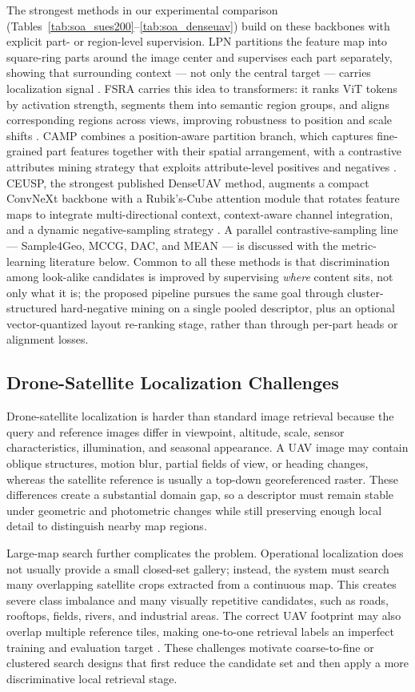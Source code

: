 \documentclass[conference]{IEEEtran}
\begin{document}
The strongest methods in our experimental comparison
(Tables~\ref{tab:soa_sues200}--\ref{tab:soa_denseuav}) build on these
backbones with explicit part- or region-level supervision. LPN partitions
the feature map into square-ring parts around the image center and
supervises each part separately, showing that surrounding context — not
only the central target — carries localization signal \cite{wang2021lpn}.
FSRA carries this idea to transformers: it ranks ViT tokens by activation
strength, segments them into semantic region groups, and aligns
corresponding regions across views, improving robustness to position and
scale shifts \cite{dai2022fsra}. CAMP combines a position-aware partition
branch, which captures fine-grained part features together with their
spatial arrangement, with a contrastive attributes mining strategy that
exploits attribute-level positives and negatives \cite{wu2024camp}. CEUSP,
the strongest published DenseUAV method, augments a compact ConvNeXt
backbone with a Rubik's-Cube attention module that rotates feature maps to
integrate multi-directional context, context-aware channel integration, and
a dynamic negative-sampling strategy \cite{xu2025ceusp}. A parallel
contrastive-sampling line — Sample4Geo, MCCG, DAC, and MEAN — is discussed
with the metric-learning literature below. Common to all these methods is
that discrimination among look-alike candidates is improved by supervising
\emph{where} content sits, not only what it is; the proposed pipeline
pursues the same goal through cluster-structured hard-negative mining on a
single pooled descriptor, plus an optional vector-quantized layout
re-ranking stage, rather than through per-part heads or alignment losses.

\subsection{Drone-Satellite Localization Challenges}
Drone-satellite localization is harder than standard image retrieval because
the query and reference images differ in viewpoint, altitude, scale, sensor
characteristics, illumination, and seasonal appearance. A UAV image may contain
oblique structures, motion blur, partial fields of view, or heading changes,
whereas the satellite reference is usually a top-down georeferenced raster.
These differences create a substantial domain gap, so a descriptor must remain
stable under geometric and photometric changes while still preserving enough
local detail to distinguish nearby map regions.

Large-map search further complicates the problem. Operational localization
does not usually provide a small closed-set gallery; instead, the system must
search many overlapping satellite crops extracted from a continuous map. This
creates severe class imbalance and many visually repetitive candidates, such as
roads, rooftops, fields, rivers, and industrial areas. The correct UAV footprint
may also overlap multiple reference tiles, making one-to-one retrieval labels an
imperfect training and evaluation target \cite{xu2024uavvisloc,li2025onetomany}.
These challenges motivate coarse-to-fine or clustered search designs that first
reduce the candidate set and then apply a more discriminative local retrieval
stage.
\end{document}
